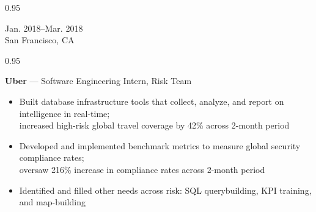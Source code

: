 \documentclass[a4paper,9pt]{article}
\newcommand{\mainMarginBottom}{\vspace*{2.5pt}}
\newcommand{\newLine}{\\}
\newcommand{\doubleColumnGap}{\hspace{4mm}}
\newcommand{\withinSectionMarginBetween}{\vspace{-2.75ex}}
\newcommand{\mainLineSpacing}{0.95}
\begin{document}
\begin{minipage}[t]{0.20\linewidth}
  \begin{small}
    \begin{spacing}\mainLineSpacing{}
      \begin{flushright}
        Jan. 2018--Mar. 2018
        \newLine{}
        \mainMarginBottom{}
        San Francisco, CA
      \end{flushright}
    \end{spacing}
  \end{small}
\end{minipage}
\doubleColumnGap{}
\begin{minipage}[t]{0.75\linewidth}
  \begin{small}
    \begin{spacing}\mainLineSpacing{}
      \begin{flushleft}
        \textbf{Uber} --- Software Engineering Intern, Risk Team
        \mainMarginBottom{}
        \begin{itemize}[itemsep=1pt,topsep=0pt,leftmargin=*]
          \item Built database infrastructure tools that collect, analyze, and report on intelligence in real-time;\\ increased high-risk global travel coverage by 42\% across 2-month period
          \item Developed and implemented benchmark metrics to measure global security compliance rates;\\ oversaw 216\% increase in compliance rates across 2-month period
          \item Identified and filled other needs across risk: SQL querybuilding, KPI training, and map-building
        \end{itemize}
      \end{flushleft}
    \end{spacing}
  \end{small}
\end{minipage}

\withinSectionMarginBetween{}
\end{document}
